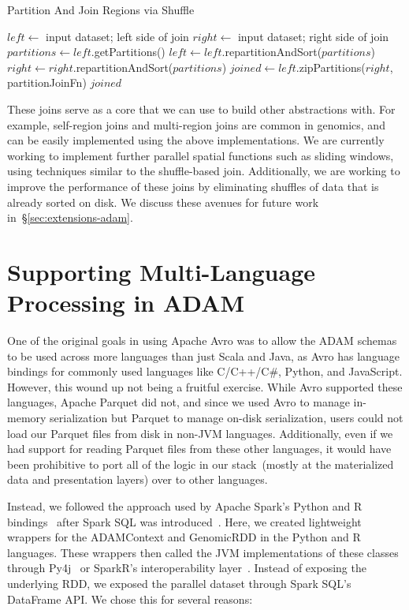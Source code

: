 \documentclass[phd]{ucbthesis}
\begin{document}
\begin{algorithm}
\caption{Partition And Join Regions via Shuffle}
\label{alg:shuffle-region-join}
\begin{algorithmic}
\STATE $left \leftarrow$ input dataset; left side of join
\STATE $right \leftarrow$ input dataset; right side of join
\STATE $partitions \leftarrow left$.getPartitions()
\STATE $left \leftarrow left$.repartitionAndSort($partitions$)
\STATE $right \leftarrow right$.repartitionAndSort($partitions$)
\STATE $joined \leftarrow left$.zipPartitions($right$, {partitionJoinFn})
\RETURN $joined$
\end{algorithmic}
\end{algorithm}

These joins serve as a core that we can use to build other abstractions with.
For example, self-region joins and multi-region joins are common in genomics,
and can be easily implemented using the above implementations. We are currently
working to implement further parallel spatial functions such as sliding windows,
using techniques similar to the shuffle-based join. Additionally, we are working
to improve the performance of these joins by eliminating shuffles of data that
is already sorted on disk. We discuss these avenues for future work
in~\S\ref{sec:extensions-adam}.

\section{Supporting Multi-Language Processing in {ADAM}}
\label{sec:multi-language}

One of the original goals in using {Apache Avro} was to allow the
{ADAM} schemas to be used across more languages than just {Scala}
and {Java}, as {Avro} has language bindings for commonly used
languages like C/C++/C\#, {Python}, and {JavaScript}. However,
this wound up not being a fruitful exercise. While {Avro} supported these
languages, {Apache Parquet} did not, and since we used {Avro} to
manage in-memory serialization but {Parquet} to manage on-disk
serialization, users could not load our {Parquet} files from disk in
non-JVM languages. Additionally, even if we had support for reading
{Parquet} files from these other languages, it would have been prohibitive
to port all of the logic in our stack~(mostly at the materialized data and
presentation layers) over to other languages.

Instead, we followed the approach used by {Apache Spark}'s
{Python} and R bindings~\cite{venkataraman16} after {Spark SQL}
was introduced~\cite{armbrust15}. Here, we created lightweight wrappers for
the {ADAMContext} and {GenomicRDD} in the {Python} and
R languages. These wrappers then called the JVM implementations of these classes
through {Py4j}~\cite{py4j} or {SparkR}'s interoperability
layer~\cite{venkataraman16}. Instead of exposing the underlying RDD, we exposed
the parallel dataset through {Spark SQL}'s {DataFrame} API. We
chose this for several reasons:
\end{document}
